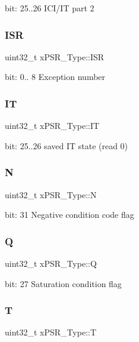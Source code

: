 bit\+: 25..26 I\+C\+I/\+IT part 2 \mbox{\label{unionx_p_s_r___type_a3e9120dcf1a829fc8d2302b4d0673970}} 
\subsubsection{\texorpdfstring{ISR}{ISR}}
{\footnotesize\ttfamily uint32\+\_\+t x\+P\+S\+R\+\_\+\+Type\+::\+I\+SR}

bit\+: 0.. 8 Exception number \mbox{\label{unionx_p_s_r___type_a3200966922a194d84425e2807a7f1328}} 
\subsubsection{\texorpdfstring{IT}{IT}}
{\footnotesize\ttfamily uint32\+\_\+t x\+P\+S\+R\+\_\+\+Type\+::\+IT}

bit\+: 25..26 saved IT state (read 0) \mbox{\label{unionx_p_s_r___type_a2db9a52f6d42809627d1a7a607c5dbc5}} 
\subsubsection{\texorpdfstring{N}{N}}
{\footnotesize\ttfamily uint32\+\_\+t x\+P\+S\+R\+\_\+\+Type\+::N}

bit\+: 31 Negative condition code flag \mbox{\label{unionx_p_s_r___type_add7cbd2b0abd8954d62cd7831796ac7c}} 
\subsubsection{\texorpdfstring{Q}{Q}}
{\footnotesize\ttfamily uint32\+\_\+t x\+P\+S\+R\+\_\+\+Type\+::Q}

bit\+: 27 Saturation condition flag \mbox{\label{unionx_p_s_r___type_a7eed9fe24ae8d354cd76ae1c1110a658}} 
\subsubsection{\texorpdfstring{T}{T}}
{\footnotesize\ttfamily uint32\+\_\+t x\+P\+S\+R\+\_\+\+Type\+::T}

